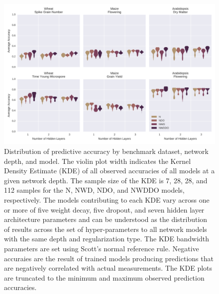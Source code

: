 
\begin{figure}[htbp]
\renewcommand{\familydefault}{\sfdefault}\normalfont
\centering 
\includegraphics[keepaspectratio,height=\textheight,width=\linewidth]{g3_article/figures/depth_comparison.png}
    \caption{Distribution of predictive accuracy by benchmark dataset, network depth, 
             and model. The violin plot width indicates the Kernel Density Estimate 
             (KDE) of all observed accuracies of all models at a given network depth. 
             The sample size of the KDE is 7, 28, 28, and 112 samples for the 
             N, NWD, NDO, and NWDDO models, respectively. The models contributing 
             to each KDE vary across one or more of five weight decay, five dropout, 
             and seven hidden layer architecture parameters and can be 
             understood as the distribution of results across the set of 
             hyper-parameters to all network models with the same depth and regularization
             type. The KDE bandwidth parameters are set using Scott's normal reference rule. 
             Negative accuraies are the result of trained models producing predictions that 
             are negatively correlated with actual measurements. The KDE plots are 
             truncated to the minimum and maximum observed prediction accuracies.} 
\label{fig:depth-comparison}
\end{figure}

